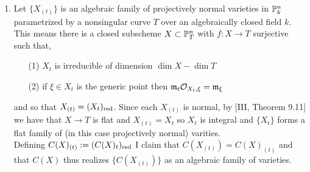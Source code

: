 \documentclass[12pt]{article}
\begin{document}
\begin{enumerate}
\item Let $\{ X_{(t)} \}$ is an algebraic family of projectively normal varieties in $\P^n_k$ parametrized by a nonsingular curve $T$ over an algebraically closed field $k$. 
\bigskip\\
This means there is a closed subscheme $X \subset \P^n_T$ with $f : X \to T$ surjective such that,
\begin{enumerate}
\item[(1)] $X_t$ is irreducible of dimension $\dim{X} - \dim{T}$
\item[(2)] if $\xi \in X_t$ is the generic point then $\m_t \stalk{X_t}{\xi} = \m_\xi$ 
\end{enumerate}
and so that $X_{(t)} = (X_t)_{\red}$. Since each $X_{(t)}$ is normal, by [III, Theorem 9.11] we have that $X \to T$ is flat and $X_{(t)} = X_t$ so $X_t$ is integral and $\{ X_t \}$ forms a flat family of (in this case projectively normal) varities. 
\bigskip\\
Defining $C(X)_{(t)} := (C(X)_t)_{\red}$ I claim that $C(X_{(t)}) = C(X)_{(t)}$ and that $C(X)$ thus realizes $\{ C(X_{(t)}) \}$ as an algebraic family of varieties.


\end{enumerate}
\end{document}
